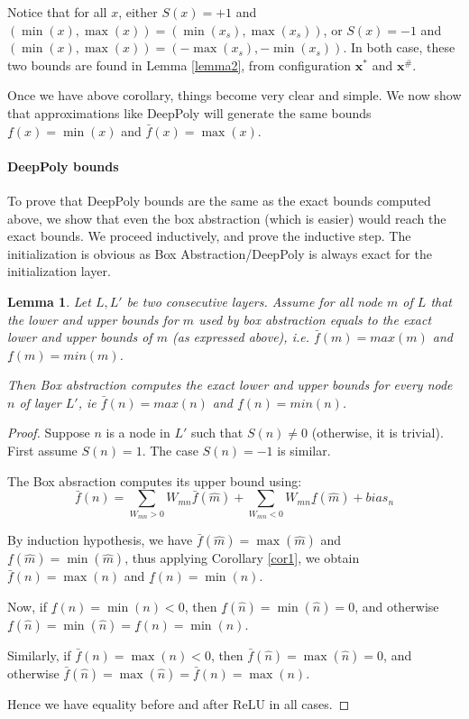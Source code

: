 \documentclass[]{article}
\newtheorem{lemma}{Lemma}
\theoremstyle{definition}
\begin{document}
Notice that for all $x$, either $S(x)=+1$ and 
$(\min(x),\max(x))=(\min(x_s),\max(x_s))$, 
or $S(x)=-1$ and $(\min(x),\max(x))=(-\max(x_s),-\min(x_s))$.
In both case, these two bounds are found in Lemma \ref{lemma2},
from configuration $\boldsymbol{x}^*$ and $\boldsymbol{x}^\#$.



Once we have above corollary, things become very clear and simple. We now show that approximations like DeepPoly will generate the same bounds 
$\underline{f}(x)=\min(x)$ and $\bar{f}(x)=\max(x)$.

\paragraph{DeepPoly bounds}

To prove that DeepPoly bounds are the same as the exact bounds computed above, 
we show that even the box abstraction (which is easier) would reach the exact bounds.
We proceed inductively, and prove the inductive step.
The initialization is obvious as Box Abstraction/DeepPoly is always exact for the initialization layer.

\begin{lemma}
	Let $L,L'$ be two consecutive layers.
	Assume for all node $m$ of $L$ that the lower and upper bounds for $m$ used by box abstraction equals to the exact lower and upper bounds of $m$ (as expressed above), i.e.
	$\bar{f}(m)=max(m)$ and $\underline{f}(m)=min(m)$.
	
	Then Box abstraction computes the exact lower and upper bounds for every node $n$ of layer $L'$, ie $\bar{f}(n)=max(n)$ and $\underline{f}(n)=min(n)$.
\end{lemma}

\begin{proof}
	Suppose $n$ is a node in $L'$ such that $S(n)\neq 0$ (otherwise, it is trivial). 
	First assume $S(n)=1$. The case $S(n)=-1$ is similar. 

	The Box absraction computes its upper bound using:
	$$\bar{f}(n)= \sum_{W_{mn}>0} W_{mn} \bar{f}(\hat{m}) + \sum_{W_{mn}<0} W_{mn} \underline{f}(\hat{m}) + bias_n$$

	By induction hypothesis, we have 
	$\bar{f}(\hat{m})=\max(\hat{m})$ and
	$\underline{f}(\hat{m})=\min(\hat{m})$, thus 
	applying Corollary \ref{cor1}, we obtain
	$\bar{f}(n)=\max(n)$ and 
	$\underline{f}(n)=\min(n)$.

	Now, if $\underline{f}(n)=\min(n)<0$, 
	then $\underline{f}(\hat{n})=\min(\hat{n})=0$, 
	and otherwise 
	$\underline{f}(\hat{n})=\min(\hat{n})=\underline{f}(n)=\min(n)$.

	Similarly, 
	if $\bar{f}(n)=\max(n)<0$, 
	then $\bar{f}(\hat{n})=\max(\hat{n})=0$, 
	and otherwise 
	$\bar{f}(\hat{n})=\max(\hat{n})=\bar{f}(n)=\max(n)$.
	
	Hence we have equality before and after ReLU in all cases.
\end{proof}
\end{document}
